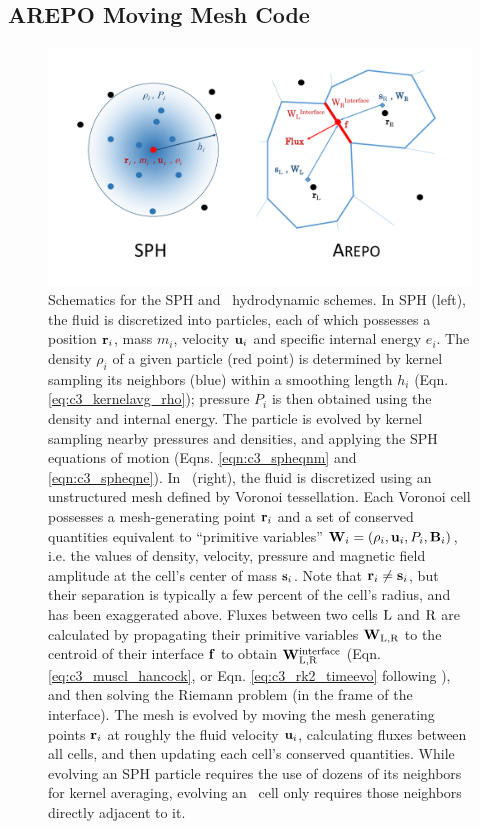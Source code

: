 
\subsection{AREPO Moving Mesh Code}
\label{ssec:c3_arepo}

\begin{figure}
\centering
\includegraphics[angle=0,width=1.0\columnwidth]{chapter3_zhu+u/figures/SPHArepoFig.pdf}
\caption{Schematics for the SPH and \arepo\ hydrodynamic schemes.  In SPH (left), the fluid is discretized into particles, each of which possesses a position ${\bf r}_i$, mass $m_i$, velocity ${\bf u}_i$ and specific internal energy $e_i$.  The density $\rho_i$ of a given particle (red point) is determined by kernel sampling its neighbors (blue) within a smoothing length $h_i$ (Eqn. \ref{eq:c3_kernelavg_rho}); pressure $P_i$ is then obtained using the density and internal energy.  The particle is evolved by kernel sampling nearby pressures and densities, and applying the SPH equations of motion (Eqns. \ref{eqn:c3_spheqnm} and \ref{eqn:c3_spheqne}).  In \arepo\ (right), the fluid is discretized using an unstructured mesh defined by Voronoi tessellation.  Each Voronoi cell possesses a mesh-generating point ${\bf r}_i$ and a set of conserved quantities equivalent to ``primitive variables'' ${\bf W}_i = \left(\rho_i, {\bf u}_i, P_i, {\bf B}_i\right)$, i.e. the values of density, velocity, pressure and magnetic field amplitude at the cell's center of mass ${\bf s}_i$.  Note that ${\bf r}_i \neq {\bf s}_i$, but their separation is typically a few percent of the cell's radius, and has been exaggerated above.  Fluxes between two cells $\mathrm{L}$ and $\mathrm{R}$ are calculated by propagating their primitive variables ${\bf W}_\mathrm{L,R}$ to the centroid of their interface ${\bf f}$ to obtain ${\bf W}_\mathrm{L,R}^\mathrm{interface}$ (Eqn. \ref{eq:c3_muscl_hancock}, or Eqn. \ref{eq:c3_rk2_timeevo} following \citealt{pakm+16}), and then solving the Riemann problem (in the frame of the interface).  The mesh is evolved by moving the mesh generating points ${\bf r}_i$ at roughly the fluid velocity ${\bf u}_i$, calculating fluxes between all cells, and then updating each cell's conserved quantities.  While evolving an SPH particle requires the use of dozens of its neighbors for kernel averaging, evolving an \arepo\ cell only requires those neighbors directly adjacent to it.}
\label{fig:c3_codediag}
\end{figure}

